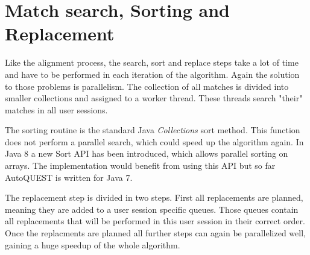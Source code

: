 \section{Match search, Sorting and Replacement}
Like the alignment process, the search, sort and replace steps take a lot of time and have to be performed in each iteration of the algorithm.
Again the solution to those problems is parallelism. The collection of all matches is divided into smaller collections and assigned to a worker thread. These threads
search "their" matches in all user sessions. 

The sorting routine is the standard Java \textit{Collections} sort method. This function does not perform a parallel search, which could speed up the algorithm again.
In Java 8 a new Sort API has been introduced, which allows parallel sorting on arrays. The implementation would  benefit from using this API but so far AutoQUEST is written for Java 7. 

The replacement step is divided in two steps. First all replacements are planned, meaning they are added to a user session specific queues. 
Those queues contain all replacements that will be performed in this user session in their correct order. 
Once the replacments are planned all further steps can again be parallelized well, gaining a huge speedup of the whole algorithm.




